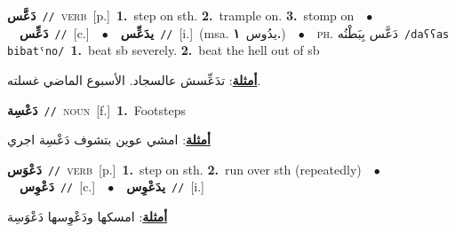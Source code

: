 \documentclass[10pt,a4paper,twoside]{article} %
\begin{document}
\begin{multicols}{2}
{\setlength\topsep{0pt}\textbf{\foreignlanguage{arabic}{دَعَّس}}\ {\color{gray}\texttt{//}\color{black}}\ \textsc{verb}\ [p.]\ \textbf{1.}~step on sth.  \textbf{2.}~trample on.  \textbf{3.}~stomp on\ \ $\bullet$\ \ \setlength\topsep{0pt}\textbf{\foreignlanguage{arabic}{دَعِّس}}\ {\color{gray}\texttt{//}\color{black}}\ [c.]\ \ $\bullet$\ \ \setlength\topsep{0pt}\textbf{\foreignlanguage{arabic}{يدَعِّس}}\ {\color{gray}\texttt{//}\color{black}}\ [i.]\ \color{gray}(msa. \foreignlanguage{arabic}{يدُوس}~\foreignlanguage{arabic}{\textbf{١.}})\color{black}\ \ $\bullet$\ \ \textsc{ph.} \color{gray} \foreignlanguage{arabic}{دَعَّس بِبَطْنُه}\color{black}\ {\color{gray}\texttt{/{\sffamily daʕʕas bibatˤno}/}\color{black}}\ \textbf{1.}~beat sb severely.  \textbf{2.}~beat the hell out of sb\  \begin{flushright}\color{gray}\foreignlanguage{arabic}{\textbf{\underline{\foreignlanguage{arabic}{أمثلة}}}: تدَعِّسش عالسجاد. الأسبوع الماضي غسلته.}\end{flushright}\color{black}} \vspace{2mm}

{\setlength\topsep{0pt}\textbf{\foreignlanguage{arabic}{دَعْسِة}}\ {\color{gray}\texttt{//}\color{black}}\ \textsc{noun}\ [f.]\ \textbf{1.}~Footsteps\  \begin{flushright}\color{gray}\foreignlanguage{arabic}{\textbf{\underline{\foreignlanguage{arabic}{أمثلة}}}: امشي عوين بتشوف دَعْسِة اجري}\end{flushright}\color{black}} \vspace{2mm}

{\setlength\topsep{0pt}\textbf{\foreignlanguage{arabic}{دَعْوَس}}\ {\color{gray}\texttt{//}\color{black}}\ \textsc{verb}\ [p.]\ \textbf{1.}~step on sth.  \textbf{2.}~run over sth (repeatedly)\ \ $\bullet$\ \ \setlength\topsep{0pt}\textbf{\foreignlanguage{arabic}{دَعْوِس}}\ {\color{gray}\texttt{//}\color{black}}\ [c.]\ \ $\bullet$\ \ \setlength\topsep{0pt}\textbf{\foreignlanguage{arabic}{يدَعْوِس}}\ {\color{gray}\texttt{//}\color{black}}\ [i.]\  \begin{flushright}\color{gray}\foreignlanguage{arabic}{\textbf{\underline{\foreignlanguage{arabic}{أمثلة}}}: امسكها ودَعْوِسها دَعْوَسِة}\end{flushright}\color{black}} \vspace{2mm}


\end{multicols}
\end{document}
